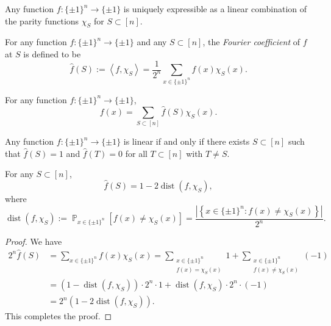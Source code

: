 \documentclass[letterpaper, reqno,11pt]{article}
\newcommand{\PP}{\mathop{{}\mathbb{P}}}
\DeclareMathOperator{\dist}{dist}
\begin{document}
\begin{corollary}
  Any function $f :  \{ \pm 1 \}^n \to \{ \pm 1 \}$ is uniquely expressible as a linear combination of the parity functions $\chi_S$ for $S \subset [n]$.
\end{corollary}

\begin{definition}
  For any function $f : \{ \pm 1 \}^n \to \{ \pm 1 \}$ and any $S \subset [n]$, the \emph{Fourier coefficient} of $f$ at $S$ is defined to be
  $$ \hat{f}(S) := \left\langle f, \chi_S \right\rangle = \frac{1}{2^n} \sum_{x \in \{ \pm 1 \}^n} f(x) \chi_S(x). $$
\end{definition}

\begin{theorem}
  For any function $f : \{ \pm 1 \}^n \to \{ \pm 1 \}$,
  $$ f(x) = \sum_{S \subset [n]} \hat{f}(S) \chi_S(x). $$
\end{theorem}

\begin{proposition} \label{prop:fourier-linear}
  Any function $f : \{ \pm 1 \}^n \to \{ \pm 1 \}$ is linear if and only if there exists $S \subset [n]$ such that $\hat{f}(S) = 1$ and $\hat{f}(T) = 0$ for all $T \subset [n]$ with $T \neq S$.
\end{proposition}

\begin{proposition} \label{prop:fourier-coeff-dist}
  For any $S \subset [n]$,
  $$ \hat{f}(S) = 1 - 2\dist\left(f, \chi_S\right), $$
  where
  $$ \dist\left(f, \chi_S\right) := \PP_{x \in \{ \pm 1 \}^n}\left[f(x) \neq \chi_S(x)\right] = \frac{\left|\left\{ x \in \{ \pm 1 \}^n : f(x) \neq \chi_S(x) \right\}\right|}{2^n}. $$
\end{proposition}

\begin{proof}
  We have
  \begin{align*}
    2^n \hat{f}(S) &= \sum_{x \in \{ \pm 1 \}^n} f(x) \chi_S(x) = \sum_{\substack{x \in \{ \pm 1 \}^n \\ f(x) = \chi_S(x)}} 1 + \sum_{\substack{x \in \{ \pm 1 \}^n \\ f(x) \neq \chi_S(x)}} (-1) \\
    &= \left(1 - \dist\left(f, \chi_S\right)\right) \cdot 2^n \cdot 1 + \dist\left(f, \chi_S\right) \cdot 2^n \cdot (-1) \\
    &= 2^n \left(1 - 2\dist\left(f, \chi_S\right)\right).
  \end{align*}
  This completes the proof.
\end{proof}
\end{document}
